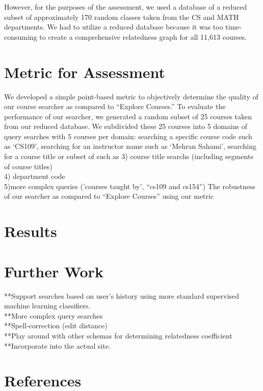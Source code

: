 \documentclass[12pt]{article}
\begin{document}
	 However, for the purposes of the assessment, we used a database of a reduced subset of approximately 170 random classes taken from the CS and MATH departments. We had to utilize a reduced database because it was too time-consuming to create a comprehensive relatedness graph for all 11,613 courses.

\section*{Metric for Assessment}
	We developed a simple point-based metric to objectively determine the quality of our course searcher as compared to ``Explore Courses.'' To evaluate the performance of our searcher, we generated a random subset of 25 courses taken from our reduced database. We subdivided these 25 courses into 5 domains of query searches with 5 courses per domain: searching a specific course code such as `CS109', searching for an instructor name such as `Mehran Sahami', searching for a course title or subset of such as 
3) course title searchs (including segments of course titles)\\
4) department code\\
5)more complex queries ('courses taught by', ``cs109 and cs154'')
	The robustness of our searcher as compared to ``Explore Courses'' using our metric 
\section*{Results}
	
\section*{Further Work}
**Support searches based on user's history using more standard supervised machine learning classifiers.\\
	**More complex query searches\\
	**Spell-correction (edit distance)\\
	**Play around with other schemas for determining relatedness coefficient\\
	**Incorporate into the actual site.\\

\section*{References}
\end{document}
